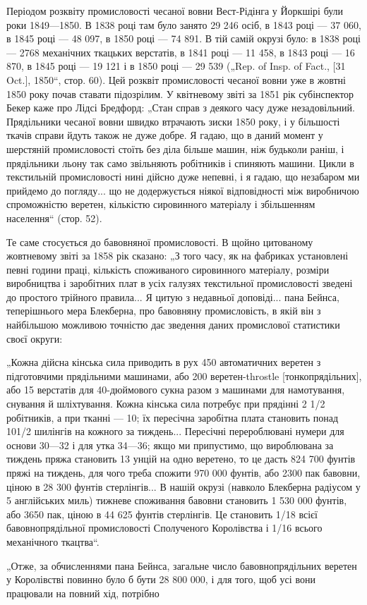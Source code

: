 Періодом розквіту промисловості чесаної вовни Вест-Рідінга
у Йоркшірі були роки 1849—1850. В 1838 році там було занято
29 246 осіб, в 1843 році — 37 060, в 1845 році — 48 097, в 1850 році —
74 891. В тій самій окрузі було: в 1838 році — 2768 механічних
ткацьких верстатів, в 1841 році — 11 458, в 1843 році — 16 870,
в 1845 році — 19 121 і в 1850 році — 29 539 („Rep. of Insp. of Fact.,
[31 Oct.], 1850“, стор. 60). Цей розквіт промисловості чесаної
вовни уже в жовтні 1850 року почав ставати підозрілим. У квітневому
звіті за 1851 рік субінспектор Бекер каже про Лідсі Бредфорд:
„Стан справ з деякого часу дуже незадовільний. Прядільники
чесаної вовни швидко втрачають зиски 1850 року, і у більшості
ткачів справи йдуть також не дуже добре. Я гадаю, що
в даний момент у шерстяній промисловості стоїть без діла більше
машин, ніж будьколи раніш, і прядільники льону так само звільняють
робітників і спиняють машини. Цикли в текстильній промисловості
нині дійсно дуже непевні, і я гадаю, що незабаром
ми прийдемо до погляду... що не додержується ніякої відповідності
між виробничою спроможністю веретен, кількістю сировинного
матеріалу і збільшенням населення“ (стор. 52).

Те саме стосується до бавовняної промисловості. В щойно
цитованому жовтневому звіті за 1858 рік сказано: „З того часу,
як на фабриках установлені певні години праці, кількість споживаного
сировинного матеріалу, розміри виробництва і заробітних
плат в усіх галузях текстильної промисловості зведені
до простого трійного правила... Я цитую з недавньої доповіді...
пана Бейнса, теперішнього мера Блекберна, про бавовняну промисловість,
в якій він з найбільшою можливою точністю дає
зведення даних промислової статистики своєї округи:

„Кожна дійсна кінська сила приводить в рух 450 автоматичних
веретен з підготовчими прядільними машинами, або 200 веретен-throstle
[тонкопрядільних], або 15 верстатів для 40-дюймового
сукна разом з машинами для намотування, снування й
шліхтування. Кожна кінська сила потребує при прядінні 2 1/2 робітників,
а при тканні — 10; їх пересічна заробітна плата становить
понад 101/2 шилінгів на кожного за тиждень... Пересічні
перероблювані нумери для основи 30—32 і для утка 34—36;
якщо ми припустимо, що вироблювана за тиждень пряжа становить
13 унцій на одно веретено, то це дасть 824 700 фунтів
пряжі на тиждень, для чого треба спожити 970 000 фунтів, або
2300 пак бавовни, ціною в 28 300 фунтів стерлінгів... В нашій
окрузі (навколо Блекберна радіусом у 5 англійських миль)
тижневе споживання бавовни становить 1 530 000 фунтів, або
3650 пак, ціною в 44 625 фунтів стерлінгів. Це становить 1/18
всієї бавовнопрядільної промисловості Сполученого Королівства
і 1/16 всього механічного ткацтва“.

„Отже, за обчисленнями пана Бейнса, загальне число бавовнопрядільних
веретен у Королівстві повинно було б бути 28 800 000,
і для того, щоб усі вони працювали на повний хід, потрібно
\parbreak{}  %
